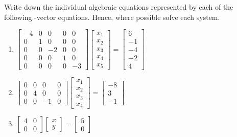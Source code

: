 \begin{exercise} \label{ex:} 
Write down the individual algebraic equations represented by each of the following -vector equations.
Hence, where possible solve each system.
\begin{enumerate}
\item \(\begin{bmatrix} -4&0&0&0&0
\\0&1&0&0&0
\\0&0&-2&0&0
\\0&0&0&1&0
\\0&0&0&0&-3 \end{bmatrix}
\begin{bmatrix}x_1\\x_2\\x_3\\x_4\\x_5\end{bmatrix}
=\begin{bmatrix} 6
\\-1
\\-4
\\-2
\\4 \end{bmatrix}\)

\item \(\begin{bmatrix} 0&0&0&0
\\0&4&0&0
\\0&0&-1&0 \end{bmatrix}
\begin{bmatrix}x_1\\x_2\\x_3\\x_4\end{bmatrix}
=\begin{bmatrix} -8
\\3
\\-1 \end{bmatrix}\)

\item \(\begin{bmatrix} 4&0
\\0&0 \end{bmatrix}
\begin{bmatrix}x\\y\end{bmatrix}
=\begin{bmatrix} 5
\\0 \end{bmatrix}\)


\end{enumerate}
\end{exercise}
